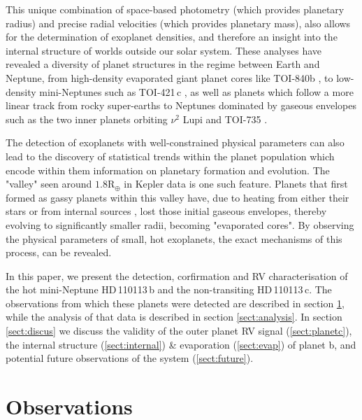 \documentclass[fleqn,usenatbib]{mnras}
\newcommand{\gcm}{g\,cm$^{-3}$}	%
\newcommand{\rearth}{R$_{\oplus}$}
\newcommand{\Tplanet}{HD\,110113\,b}
\newcommand{\Tplanetc}{HD\,110113\,c}
\begin{document}
This unique combination of space-based photometry (which provides planetary radius) and precise radial velocities (which provides planetary mass), also allows for the determination of exoplanet densities, and therefore an insight into the internal structure of worlds outside our solar system.
These analyses have revealed a diversity of planet structures in the regime between Earth and Neptune, from high-density evaporated giant planet cores like TOI-840b \citep[5.2\gcm{}][]{armstrong2020remnant}, to low-density mini-Neptunes such as TOI-421\,c \citep{carleo2020multi}, as well as planets which follow a more linear track from rocky super-earths to Neptunes dominated by gaseous envelopes such as the two inner planets orbiting $\nu^2$ Lupi \citep{kane2020transits} and TOI-735 \cite{cloutier2020pair,nowak2020carmenes}.

The detection of exoplanets with well-constrained physical parameters can also lead to the discovery of statistical trends within the planet population which encode within them information on planetary formation and evolution.
The "valley" seen around $1.8$\rearth{} in Kepler data \citep{fulton2017california, van2018asteroseismic} is one such feature.
Planets that first formed as gassy planets within this valley have, due to heating from either their stars \citep[e.g. evaporation][]{owen2017evaporation} or from internal sources \citep[e.g. core-powered mass loss][]{ginzburg2018core}, lost those initial gaseous envelopes, thereby evolving to significantly smaller radii, becoming "evaporated cores".
By observing the physical parameters of small, hot exoplanets, the exact mechanisms of this process, can be revealed.

In this paper, we present the detection, corfirmation and RV characterisation of the hot mini-Neptune \Tplanet{} and the non-transiting \Tplanetc{}. 
The observations from which these planets were detected are described in section \ref{sect:observations}, while the analysis of that data is described in section \ref{sect:analysis}.
In section \ref{sect:discus} we discuss the validity of the outer planet RV signal (\ref{sect:planetc}), the internal structure (\ref{sect:internal}) & evaporation (\ref{sect:evap}) of planet b, and potential future observations of the system (\ref{sect:future}).

\section{Observations}
\label{sect:observations}
\end{document}
